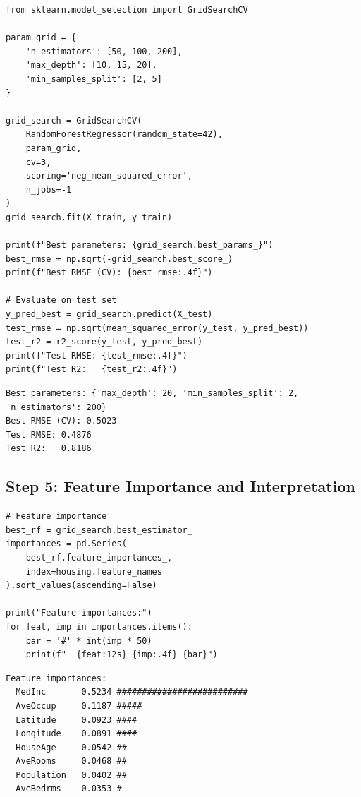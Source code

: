 
\begin{codeblock}[title=\textbf{Python}]
\begin{verbatim}
from sklearn.model_selection import GridSearchCV

param_grid = {
    'n_estimators': [50, 100, 200],
    'max_depth': [10, 15, 20],
    'min_samples_split': [2, 5]
}

grid_search = GridSearchCV(
    RandomForestRegressor(random_state=42),
    param_grid,
    cv=3,
    scoring='neg_mean_squared_error',
    n_jobs=-1
)
grid_search.fit(X_train, y_train)

print(f"Best parameters: {grid_search.best_params_}")
best_rmse = np.sqrt(-grid_search.best_score_)
print(f"Best RMSE (CV): {best_rmse:.4f}")

# Evaluate on test set
y_pred_best = grid_search.predict(X_test)
test_rmse = np.sqrt(mean_squared_error(y_test, y_pred_best))
test_r2 = r2_score(y_test, y_pred_best)
print(f"Test RMSE: {test_rmse:.4f}")
print(f"Test R2:   {test_r2:.4f}")
\end{verbatim}
\end{codeblock}

\begin{codeoutput}
\begin{verbatim}
Best parameters: {'max_depth': 20, 'min_samples_split': 2, 'n_estimators': 200}
Best RMSE (CV): 0.5023
Test RMSE: 0.4876
Test R2:   0.8186
\end{verbatim}
\end{codeoutput}

\subsection{Step 5: Feature Importance and Interpretation}

\begin{codeblock}[title=\textbf{Python}]
\begin{verbatim}
# Feature importance
best_rf = grid_search.best_estimator_
importances = pd.Series(
    best_rf.feature_importances_,
    index=housing.feature_names
).sort_values(ascending=False)

print("Feature importances:")
for feat, imp in importances.items():
    bar = '#' * int(imp * 50)
    print(f"  {feat:12s} {imp:.4f} {bar}")
\end{verbatim}
\end{codeblock}

\begin{codeoutput}
\begin{verbatim}
Feature importances:
  MedInc       0.5234 ##########################
  AveOccup     0.1187 #####
  Latitude     0.0923 ####
  Longitude    0.0891 ####
  HouseAge     0.0542 ##
  AveRooms     0.0468 ##
  Population   0.0402 ##
  AveBedrms    0.0353 #
\end{verbatim}
\end{codeoutput}

